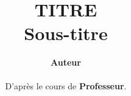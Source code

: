 \documentclass[12pt]{article}
\newcommand{\thetitle}{Titre}
\newcommand{\thesubtitle}{Sous-titre}
\newcommand{\theauthor}{Auteur}
\newcommand{\theprofessor}{Professeur}
\begin{document}
\setlength{\headheight}{15pt}

\title{ \normalsize \textsc{}
\\ [2.0cm]
\HRule{1.5pt} \\
\LARGE \textbf{\uppercase{\thetitle}
\HRule{2.0pt} \\ [0.6cm] \LARGE{\thesubtitle} \vspace*{10\baselineskip}}
}
\date{}
\author{\textbf{\theauthor}\\\\D'après le cours de \textbf{\theprofessor}.}

\maketitle
\newpage

\tableofcontents
\newpage


\newpage


\end{document}
